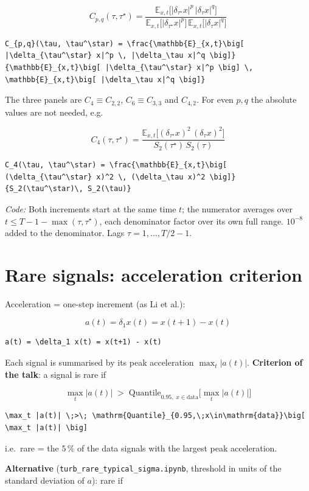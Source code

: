 \documentclass[11pt]{article}
\newcommand{\codenote}[1]{{\small\color{notegray}\emph{Code:} #1\par}}
\begin{document}
\[
C_{p,q}(\tau, \tau^\star) = \frac{\mathbb{E}_{x,t}\big[ |\delta_{\tau^\star} x|^p \, |\delta_\tau x|^q \big]}{\mathbb{E}_{x,t}\big[ |\delta_{\tau^\star} x|^p \big] \, \mathbb{E}_{x,t}\big[ |\delta_\tau x|^q \big]}
\]
\begin{lstlisting}
C_{p,q}(\tau, \tau^\star) = \frac{\mathbb{E}_{x,t}\big[ |\delta_{\tau^\star} x|^p \, |\delta_\tau x|^q \big]}{\mathbb{E}_{x,t}\big[ |\delta_{\tau^\star} x|^p \big] \, \mathbb{E}_{x,t}\big[ |\delta_\tau x|^q \big]}
\end{lstlisting}
The three panels are $C_4 \equiv C_{2,2}$, \; $C_6 \equiv C_{3,3}$ and $C_{4,2}$. For even $p, q$ the absolute values are not needed, e.g.

\[
C_4(\tau, \tau^\star) = \frac{\mathbb{E}_{x,t}\big[ (\delta_{\tau^\star} x)^2 \, (\delta_\tau x)^2 \big]}{S_2(\tau^\star)\, S_2(\tau)}
\]
\begin{lstlisting}
C_4(\tau, \tau^\star) = \frac{\mathbb{E}_{x,t}\big[ (\delta_{\tau^\star} x)^2 \, (\delta_\tau x)^2 \big]}{S_2(\tau^\star)\, S_2(\tau)}
\end{lstlisting}
\codenote{Both increments start at the same time $t$; the numerator averages over $t \le T-1-\max(\tau, \tau^\star)$, each denominator factor over its own full range. $10^{-8}$ added to the denominator. Lags $\tau = 1,\dots,T/2-1$.}
\section{Rare signals: acceleration criterion}
Acceleration = one-step increment (as Li et al.):

\[
a(t) = \delta_1 x(t) = x(t+1) - x(t)
\]
\begin{lstlisting}
a(t) = \delta_1 x(t) = x(t+1) - x(t)
\end{lstlisting}
Each signal is summarised by its peak acceleration $\max_t |a(t)|$. \textbf{Criterion of the talk}: a signal is rare if

\[
\max_t |a(t)| \;>\; \mathrm{Quantile}_{0.95,\;x\in\mathrm{data}}\big[ \max_t |a(t)| \big]
\]
\begin{lstlisting}
\max_t |a(t)| \;>\; \mathrm{Quantile}_{0.95,\;x\in\mathrm{data}}\big[ \max_t |a(t)| \big]
\end{lstlisting}
i.e.\ rare = the $5\,\%$ of the data signals with the largest peak acceleration.

\textbf{Alternative} (\texttt{turb\_rare\_typical\_sigma.ipynb}, threshold in units of the standard deviation of $a$): rare if
\end{document}
